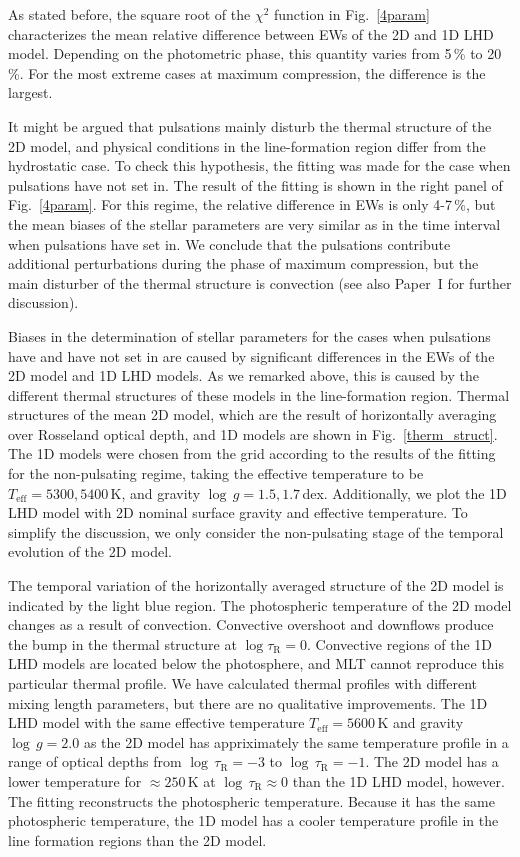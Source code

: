 \documentclass{aa}
\begin{document}
As stated before, the square root of the $\chi^2$ function in
Fig.~\ref{4param} characterizes the mean relative difference between EWs of
the 2D and 1D LHD model.  Depending on the photometric phase, this quantity
varies from 5\,\% to 20\,\%. For the most extreme cases at maximum
compression, the difference is the largest.


It might be argued that pulsations mainly disturb the thermal structure of the
2D model, and physical conditions in the line-formation region
differ from the hydrostatic case.  To check this hypothesis, the fitting was
made for the case when pulsations have not set in.  The result of the fitting
is shown in the right panel of Fig.~\ref{4param}.  For this
regime, the relative difference in EWs is only 4-7\,\%, but the mean biases of the stellar parameters are very similar as in the time interval when
pulsations have set in. We conclude that the pulsations contribute additional
perturbations during the phase of maximum compression, but the main disturber
of the thermal structure is convection (see also Paper~I for further
discussion).

Biases in the determination of stellar parameters for the cases when
pulsations have and have not set in are caused by significant differences in
the EWs of the 2D model and 1D LHD models.  As we remarked above, this is
caused by the different thermal structures of these models in the
line-formation region.  Thermal structures of the mean 2D model, which are the
result of horizontally averaging over Rosseland optical depth, and 1D models
are shown in Fig.~\ref{therm_struct}.  The 1D models were chosen 
from the grid according to the results of the fitting for the non-pulsating regime,
taking  the effective temperature to be $T_\mathrm{eff}=5300,5400$\,K, and gravity 
 $\log\,g=1.5, 1.7$\,dex. Additionally, we  plot the 1D LHD model with 
 2D nominal surface gravity and effective temperature.  To simplify the discussion, 
 we only consider  the non-pulsating stage of the temporal evolution of the 2D model.
 
The temporal variation of the horizontally averaged structure of the 2D model
is indicated by the light blue region.  The photospheric temperature of the 2D
model changes as a result of convection. Convective overshoot and downflows
produce the bump in the thermal structure at $\log\tau_\mathrm{R}=0$.
Convective regions of the 1D LHD models are located below the photosphere, and
MLT cannot reproduce this particular thermal profile.  We have calculated
thermal profiles with different mixing length parameters, but there are no
qualitative improvements. The 1D LHD model with the same
effective temperature $T_\mathrm{eff}=5600$\,K and gravity $\log\,g=2.0$ as
the 2D model has appriximately the same temperature profile in a range of optical
depths from $\log\,\tau_\mathrm{R}=-3$ to $\log\,\tau_\mathrm{R}=-1$.
The 2D model has  a lower temperature for $\approx 250$\,K
 at $\log\,\tau _\mathrm{R}\approx 0$ than the 1D LHD model,
however.
The fitting
reconstructs the photospheric temperature.  Because it has the same 
photospheric temperature, the 1D model has  a cooler temperature
profile in the line formation regions  than  the 2D model.
\end{document}
